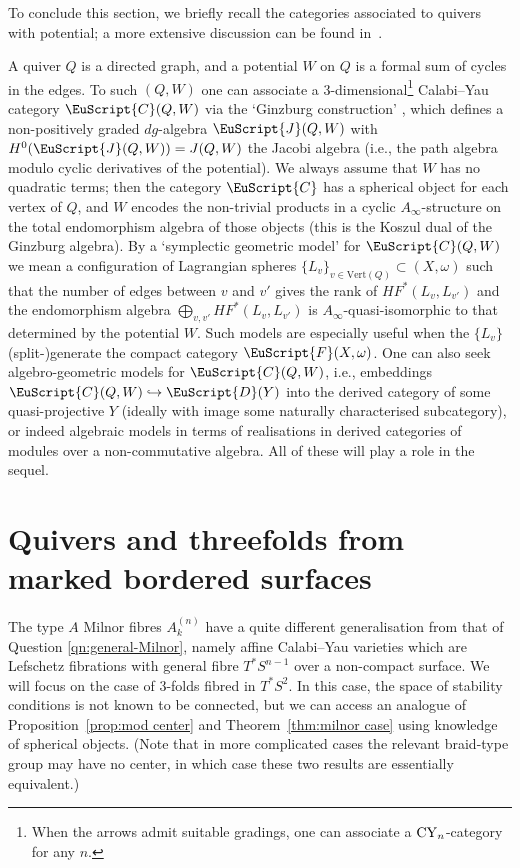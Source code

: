 \documentclass[10pt,a4paper]{amsart}
\def\scrJ{\EuScript{J}}
\newcommand{\scrF}{\EuScript{F}}
\newcommand{\scrC}{\EuScript{C}}
\def\scrD{\EuScript{D}}
\theoremstyle{definition}
\numberwithin{equation}{section}
\begin{document}
To conclude this section, we briefly recall the categories associated to quivers with potential; a more extensive discussion can be found in~\cite{Smith:quiver}.

A quiver $Q$ is a directed graph, and a potential $W$ on $Q$ is a formal sum of cycles in the edges. To such $(Q,W)$ one can associate a 3-dimensional\footnote{When the arrows admit suitable gradings, one can associate a ${\rm CY}_n$-category for any $n$.} Calabi--Yau category $\scrC(Q,W)$ via the `Ginzburg construction' \cite{Ginzburg}, which defines a non-positively graded $dg$-algebra $\scrJ(Q,W)$ with $H^0(\scrJ(Q,W)) = J(Q,W)$ the Jacobi algebra (i.e., the path algebra modulo cyclic derivatives of the potential).
We always assume that $W$ has no quadratic terms; then the category $\scrC$ has a spherical object for each vertex of $Q$, and $W$ encodes the non-trivial products in a cyclic $A_{\infty}$-structure on the total endomorphism algebra of those objects (this is the Koszul dual of the Ginzburg algebra). By a `symplectic geometric model' for $\scrC(Q,W)$ we mean a configuration of Lagrangian spheres $\{L_v\}_{v \in \mathrm{Vert}(Q)} \subset (X,\omega)$ such that the number of edges between $v$ and $v'$ gives the rank of $HF^*(L_v,L_{v'})$ and the endomorphism algebra $\bigoplus_{v,v'} HF^*(L_v,L_{v'})$ is $A_{\infty}$-quasi-isomorphic to that determined by the potential $W$. Such models are especially useful when the $\{L_v\}$ (split-)generate the compact category $\scrF(X,\omega)$. One can also seek algebro-geometric models for $\scrC(Q,W)$, i.e., embeddings $\scrC(Q,W) \hookrightarrow \scrD(Y)$ into the derived category of some quasi-projective $Y$ (ideally with image some naturally characterised subcategory), or indeed algebraic models in terms of realisations in derived categories of modules over a non-commutative algebra. All of these will play a role in the sequel.


\section{Quivers and threefolds from marked bordered surfaces}\label{sec:marked-bordered-surfaces}

The type $A$ Milnor fibres $A_k^{(n)}$ have a quite different generalisation from that of Question \ref{qn:general-Milnor}, namely affine Calabi--Yau varieties which are Lefschetz fibrations with general fibre $T^*S^{n-1}$ over a non-compact surface.
We will focus on the case of $3$-folds fibred in $T^*S^2$. In this case, the space of stability conditions is not known to be connected, but we can access an analogue of Proposition~\ref{prop:mod center} and Theorem~\ref{thm:milnor case} using knowledge of spherical objects. (Note that in more complicated cases the relevant braid-type group may have no center, in which case these two results are essentially equivalent.)
\end{document}

